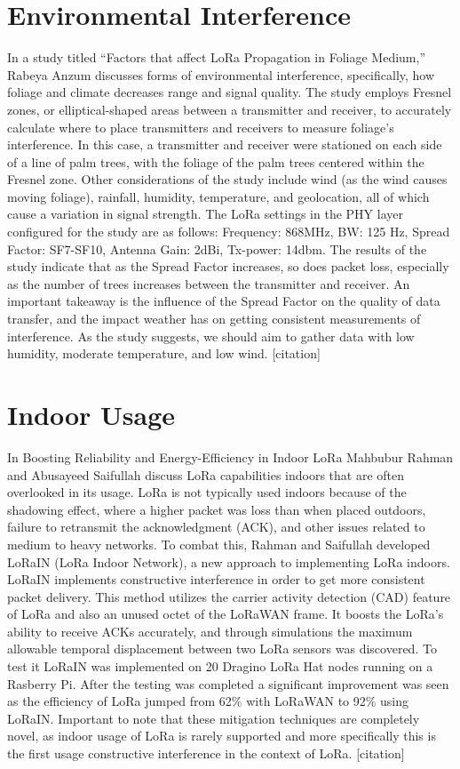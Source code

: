 \documentclass[sigsmall]{acmart}
\begin{document}
\section*{Environmental Interference}
In a study titled “Factors that affect LoRa Propagation in Foliage Medium,” Rabeya Anzum discusses forms of environmental interference, specifically, how foliage and climate decreases range and signal quality. The study employs Fresnel zones, or elliptical-shaped areas between a transmitter and receiver, to accurately calculate where to place transmitters and receivers to measure foliage's interference. In this case, a transmitter and receiver were stationed on each side of a line of palm trees, with the foliage of the palm trees centered within the Fresnel zone. Other considerations of the study include wind (as the wind causes moving foliage), rainfall, humidity, temperature, and geolocation, all of which cause a variation in signal strength. The LoRa settings in the PHY layer configured for the study are as follows: Frequency: 868MHz, BW: 125 Hz, Spread Factor: SF7-SF10, Antenna Gain: 2dBi, Tx-power: 14dbm. The results of the study indicate that as the Spread Factor increases, so does packet loss, especially as the number of trees increases between the transmitter and receiver. An important takeaway is the influence of the Spread Factor on the quality of data transfer, and the impact weather has on getting consistent measurements of interference. As the study suggests, we should aim to gather data with low humidity, moderate temperature, and low wind. [citation]

\section*{Indoor Usage}
In Boosting Reliability and Energy-Efficiency in Indoor LoRa Mahbubur Rahman and Abusayeed Saifullah discuss LoRa capabilities indoors that are often overlooked in its usage. LoRa is not typically used indoors because of the shadowing effect, where a higher packet was loss than when placed outdoors, failure to retransmit the acknowledgment (ACK), and other issues related to medium to heavy networks. To combat this, Rahman and Saifullah developed LoRaIN (LoRa Indoor Network), a new approach to implementing LoRa indoors. LoRaIN implements constructive interference in order to get more consistent packet delivery. This method utilizes the carrier activity detection (CAD) feature of LoRa and also an unused octet of the LoRaWAN frame. It boosts the LoRa's ability to receive ACKs accurately, and through simulations the maximum allowable temporal displacement between two LoRa sensors was discovered. To test it LoRaIN was implemented on 20 Dragino LoRa Hat nodes running on a Rasberry Pi. After the testing was completed a significant improvement was seen as the efficiency of LoRa jumped from 62\% with LoRaWAN to 92\% using LoRaIN. Important to note that these mitigation techniques are completely novel, as indoor usage of LoRa is rarely supported and more specifically this is the first usage constructive interference in the context of LoRa. [citation]
\end{document}
